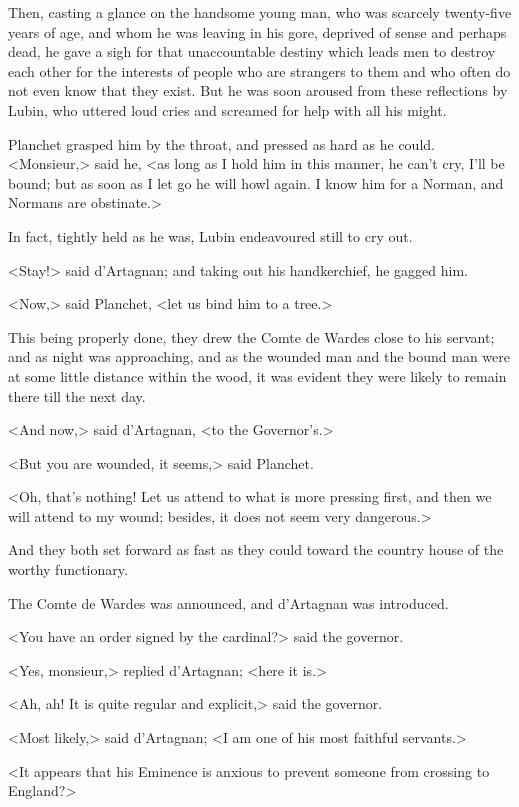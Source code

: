 Then, casting a glance on the handsome young man, who was scarcely twenty-five years of age, and whom he was leaving in his gore, deprived of sense and perhaps dead, he gave a sigh for that unaccountable destiny which leads men to destroy each other for the interests of people who are strangers to them and who often do not even know that they exist. But he was soon aroused from these reflections by Lubin, who uttered loud cries and screamed for help with all his might. 

Planchet grasped him by the throat, and pressed as hard as he could. <Monsieur,> said he, <as long as I hold him in this manner, he can't cry, I'll be bound; but as soon as I let go he will howl again. I know him for a Norman, and Normans are obstinate.> 

In fact, tightly held as he was, Lubin endeavoured still to cry out. 

<Stay!> said d'Artagnan; and taking out his handkerchief, he gagged him. 

<Now,> said Planchet, <let us bind him to a tree.> 

This being properly done, they drew the Comte de Wardes close to his servant; and as night was approaching, and as the wounded man and the bound man were at some little distance within the wood, it was evident they were likely to remain there till the next day. 

<And now,> said d'Artagnan, <to the Governor's.> 

<But you are wounded, it seems,> said Planchet. 

<Oh, that's nothing! Let us attend to what is more pressing first, and then we will attend to my wound; besides, it does not seem very dangerous.> 

And they both set forward as fast as they could toward the country house of the worthy functionary. 

The Comte de Wardes was announced, and d'Artagnan was introduced. 

<You have an order signed by the cardinal?> said the governor. 

<Yes, monsieur,> replied d'Artagnan; <here it is.> 

<Ah, ah! It is quite regular and explicit,> said the governor. 

<Most likely,> said d'Artagnan; <I am one of his most faithful servants.> 

<It appears that his Eminence is anxious to prevent someone from crossing to England?> 

